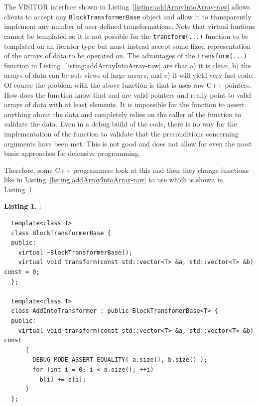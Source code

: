 \documentclass[pdf,ps2pdf,11pt]{SANDreport}
\newtheorem{listing}{Listing}
\begin{document}
The VISITOR interface shown in
Listing~\ref{listing:addArrayIntoArray-raw} allows clients to accept
any {}\texttt{BlockTransformerBase} object and allow it to
transparently implement any number of user-defined transformations.
Note that virtual funtions cannot be templated so it is not possible
for the {}\texttt{transform(...)} function to be templated on an
iterator type but must instead accept some fixed representation of the
arrays of data to be operated on.  The advantages of the
{}\texttt{transform(...)} function in
Listing~\ref{listing:addArrayIntoArray-raw} are that a) it is clean,
b) the arrays of data can be sub-views of large arrays, and c) it will
yield very fast code.  Of course the problem with the above function
{} is that is uses raw C++ pointers.  How does the
function {} know that {} and {} are
valid pointers and really point to valid arrays of data with at least
{} elements.  It is impossible for the function
{} to assert anything about the data and
completely relies on the caller of the function to validate the data.
Even in a debug build of the code, there is no way for the
implementation of the function {} to validate that
the preconditions concerning arguments have been met.  This is not
good and does not allow for even the most basic approaches for
defensive programming.

Therefore, some C++ programmers look at this and then they change
functions like {} in
Listing~\ref{listing:addArrayIntoArray-raw} to use {}
which is shown in Listing~\ref{listing:addArrayIntoArray-std-vector}.

\begin{listing}:\\
\label{listing:addArrayIntoArray-std-vector}
{\small\begin{verbatim}
  template<class T>
  class BlockTransformerBase {
  public:
    virtual ~BlockTransformerBase();
    virtual void transform(const std::vector<T> &a, std::vector<T> &b) const = 0;
  };

  template<class T>
  class AddIntoTransformer : public BlockTransfomerBase<T> {
  public:
    virtual void transform(const std::vector<T> &a, std::vector<T> &b) const
      {
        DEBUG_MODE_ASSERT_EQUALITY( a.size(), b.size() );
        for (int i = 0; i < a.size(); ++i)
          b[i] += a[i];
      }
  };
\end{verbatim}}
\end{listing}
\end{document}

